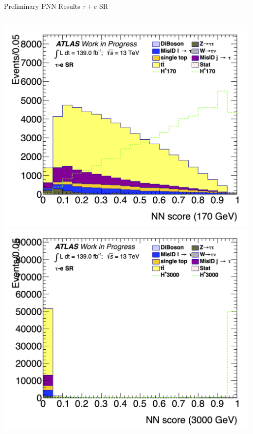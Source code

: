 \documentclass[aspectratio=169,xcolor=table]{beamer}
\begin{document}
\begin{frame}[t]{Preliminary PNN Results $\tau+e$ SR}
\begin{columns}[t]
        \includegraphics[height=.43\textheight,keepaspectratio=true]{Scores/taulep/myOutDirClfEval_1p_noUpsilon_test_full/clf_score_GB200_mass_170to170_SR_TAUEL.png}
        \includegraphics[height=.43\textheight,keepaspectratio=true]{Scores/taulep/myOutDirClfEval_1p_noUpsilon_test_full/clf_score_GB200_mass_3000to3000_SR_TAUEL.png}
      \end{columns}
    \end{frame}
\end{document}
